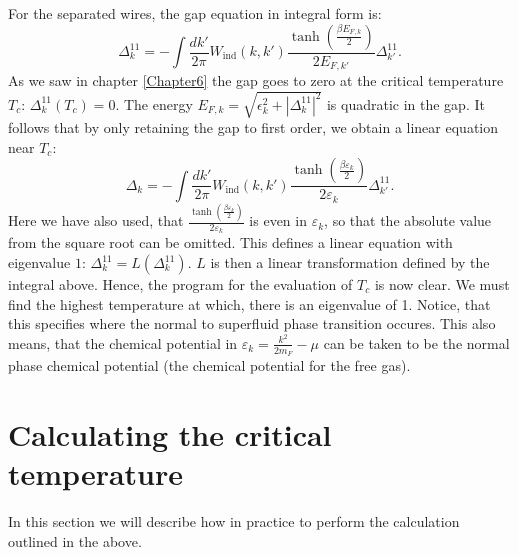 For the separated wires, the gap equation in integral form is:
\begin{equation}
\Delta^{11}_k = - \int \frac{dk'}{2\pi} W_{\text{ind}}(k,k')\frac{\tanh\left(\frac{\beta E_{F,k}}{2}\right)}{2E_{F,k'}}\Delta^{11}_{k'}. \nonumber
\end{equation} 
As we saw in chapter \ref{Chapter6} the gap goes to zero at the critical temperature $T_c$: $\Delta^{11}_k(T_c) = 0$. The energy $E_{F,k} = \sqrt{\epsilon_k^2 + |\Delta^{11}_k|^2}$ is quadratic in the gap. It follows that by only retaining the gap to first order, we obtain a linear equation near $T_c$:
\begin{equation}
\Delta_k = - \int \frac{dk'}{2\pi} W_{\text{ind}}(k,k')\frac{\tanh\left(\frac{\beta \varepsilon_k}{2}\right)}{2\varepsilon_k} \Delta^{11}_{k'}.
\label{eq.GapequationIntegralLinear}
\end{equation} 
Here we have also used, that $\frac{\tanh\left(\frac{\beta \varepsilon_k}{2}\right)}{2\varepsilon_k}$ is even in $\varepsilon_k$, so that the absolute value from the square root can be omitted. This defines a linear equation with eigenvalue $1$: $\Delta^{11}_k = L(\Delta^{11}_k)$. $L$ is then a linear transformation defined by the integral above. Hence, the program for the evaluation of $T_c$ is now clear. We must find the highest temperature at which, there is an eigenvalue of 1. Notice, that this specifies where the normal to superfluid phase transition occures. This also means, that the chemical potential in $\varepsilon_k = \frac{k^2}{2m_F} - \mu$ can be taken to be the normal phase chemical potential (the chemical potential for the free gas). 

\section{Calculating the critical temperature} \label{sec.criticaltemperature.numerical}
In this section we will describe how in practice to perform the calculation outlined in the above. 

